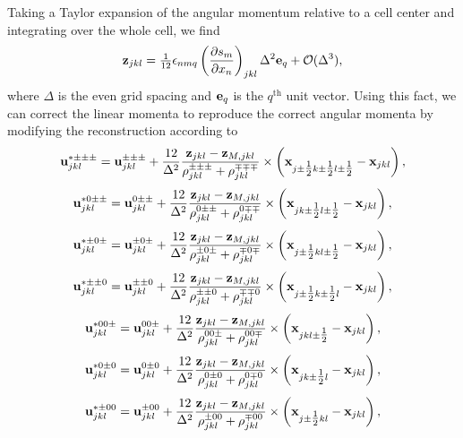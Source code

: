 \documentclass{aastex63}
\begin{document}
Taking a Taylor expansion of the angular momentum relative to a cell center and integrating over the whole cell, we find
\begin{equation}
{\vect{z}}_{j k l} = \tfrac{1}{12} \epsilon_{n m q} \left(\frac{\partial s_{m}}{\partial x_n}\right)_{j k l} \Delta^2 \vect{e}_q + \vect{\mathcal{O}}(\Delta^3),
\end{equation}
where $\Delta$ is the even grid spacing and ${\bf e}_q$ is the $q^\mathrm{th}$ unit vector. Using this fact, we can correct the linear momenta to reproduce the
correct angular momenta by modifying the reconstruction according to
\begin{equation}
\vect{u}^{* \pm\pm\pm}_{j k l} = \vect{u}^{\pm\pm\pm}_{j k l} + \frac{12}{\Delta^2} \frac{\vect{z}_{j k l} - \vect{z}_{M, j k l}}{\rho^{\pm\pm\pm}_{j k l}+\rho^{\mp\mp\mp}_{j k l}} \times \left( \vect{x}_{j\pm\tfrac{1}{2}k\pm\tfrac{1}{2}l\pm\tfrac{1}{2}} - \vect{x}_{j k l} \right),
\label{beg_cor}
\end{equation}
\begin{equation}
\vect{u}^{* 0\pm\pm}_{j k l} = \vect{u}^{0\pm\pm}_{j k l} + \frac{12}{\Delta^2} \frac{\vect{z}_{j k l} - \vect{z}_{M, j k l}}{\rho^{0\pm\pm}_{j k l}+\rho^{0\mp\mp}_{j k l}} \times \left( \vect{x}_{j k\pm\tfrac{1}{2}l\pm\tfrac{1}{2}} - \vect{x}_{j k l} \right),
\end{equation}
\begin{equation}
\vect{u}^{* \pm 0\pm}_{j k l} = \vect{u}^{\pm 0\pm}_{j k l} + \frac{12}{\Delta^2} \frac{\vect{z}_{j k l} - \vect{z}_{M, j k l}}{\rho^{\pm 0\pm}_{j k l}+\rho^{\mp 0\mp}_{j k l}} \times \left( \vect{x}_{j\pm\tfrac{1}{2} k l\pm\tfrac{1}{2}} - \vect{x}_{j k l} \right),
\end{equation}
\begin{equation}
\vect{u}^{* \pm\pm 0}_{j k l} = \vect{u}^{\pm\pm 0}_{j k l} + \frac{12}{\Delta^2} \frac{\vect{z}_{j k l} - \vect{z}_{M, j k l}}{\rho^{\pm\pm 0}_{j k l}+\rho^{\mp\mp 0}_{j k l}} \times \left( \vect{x}_{j\pm\tfrac{1}{2} k\pm\tfrac{1}{2}l} - \vect{x}_{j k l} \right),
\end{equation}
\begin{equation}
\vect{u}^{* 0 0\pm}_{j k l} = \vect{u}^{0 0\pm}_{j k l} + \frac{12}{\Delta^2} \frac{\vect{z}_{j k l} - \vect{z}_{M, j k l}}{\rho^{0 0\pm}_{j k l}+\rho^{0 0\mp}_{j k l}} \times \left( \vect{x}_{j k l\pm\tfrac{1}{2}} - \vect{x}_{j k l} \right),
\end{equation}
\begin{equation}
\vect{u}^{* 0 \pm 0}_{j k l} = \vect{u}^{0\pm 0}_{j k l} + \frac{12}{\Delta^2} \frac{\vect{z}_{j k l} - \vect{z}_{M, j k l}}{\rho^{0\pm 0}_{j k l}+\rho^{0 \mp 0}_{j k l}} \times \left( \vect{x}_{j k\pm\tfrac{1}{2} l} - \vect{x}_{j k l} \right),
\end{equation}
\begin{equation}
\vect{u}^{* \pm 0 0}_{j k l} = \vect{u}^{\pm 0 0}_{j k l} + \frac{12}{\Delta^2} \frac{\vect{z}_{j k l} - \vect{z}_{M, j k l}}{\rho^{\pm 0 0}_{j k l}+\rho^{\mp 0 0}_{j k l}} \times \left( \vect{x}_{j\pm\tfrac{1}{2} k l} - \vect{x}_{j k l} \right),
\label{end_cor}
\end{equation}
\end{document}
